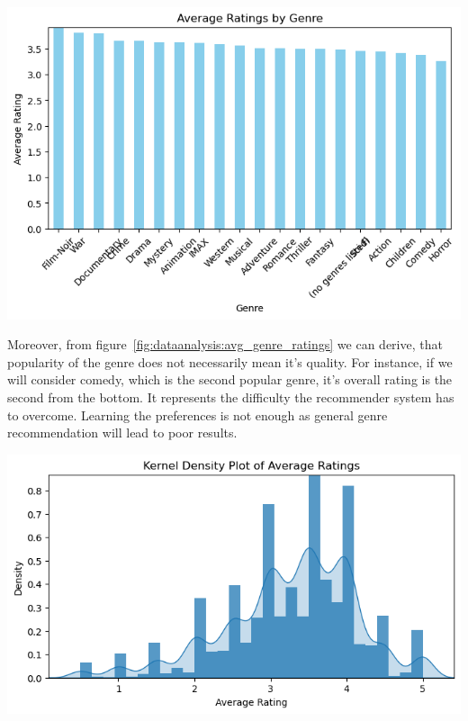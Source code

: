 \begin{minipage}{\linewidth}
    \centering%
    \includegraphics[scale=0.3]{assets/genre_rating.png}%
    \label{fig:dataanalysis:avg_genre_ratings}%
\end{minipage}

Moreover, from figure~\ref{fig:dataanalysis:avg_genre_ratings} we can derive,
that popularity of the genre does not necessarily mean it's quality. For
instance, if we will consider comedy, which is the second popular genre, it's
overall rating is the second from the bottom. It represents the difficulty the
recommender system has to overcome. Learning the preferences is not enough as
general genre recommendation will lead to poor results.

\begin{minipage}{\linewidth}
    \centering%
    \includegraphics[scale=0.3]{assets/average_ratings_pretty.png}%
    \label{fig:dataanalysis:avg_movie_ratings}%
\end{minipage}

